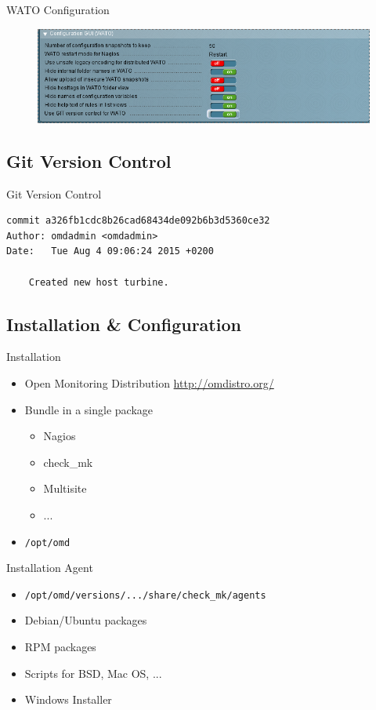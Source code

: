 \begin{frame}{WATO Configuration}
\begin{figure}
\includegraphics[width=\textwidth]{images/wato-config.png}
\end{figure}
\end{frame}

\subsection{Git Version Control}
\begin{frame}[fragile]{Git Version Control}
\begin{lstlisting}
commit a326fb1cdc8b26cad68434de092b6b3d5360ce32
Author: omdadmin <omdadmin>
Date:   Tue Aug 4 09:06:24 2015 +0200

    Created new host turbine.

\end{lstlisting}
\end{frame}

\subsection{Installation \& Configuration}

\begin{frame}[fragile]{Installation}
\begin{itemize}
\item Open Monitoring Distribution \url{http://omdistro.org/}
\item Bundle in a single package
\begin{itemize}
\item Nagios
\item check\_mk
\item Multisite
\item ...
\end{itemize}
\item \verb|/opt/omd|
\end{itemize}
\end{frame}

\begin{frame}[fragile]{Installation Agent}
\begin{itemize}
\item \verb|/opt/omd/versions/.../share/check_mk/agents|
\item Debian/Ubuntu packages
\item RPM packages
\item Scripts for BSD, Mac OS, ...
\item Windows Installer
\end{itemize}
\end{frame}

